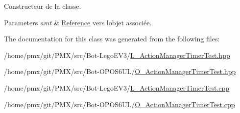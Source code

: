 Constructeur de la classe. 


\begin{DoxyParams}{Parameters}
{\em amt} & \hyperlink{structReference}{Reference} vers l\textquotesingle{}objet associée. \\
\hline
\end{DoxyParams}


The documentation for this class was generated from the following files\+:\begin{DoxyCompactItemize}
\item 
/home/pmx/git/\+P\+M\+X/src/\+Bot-\/\+Lego\+E\+V3/\hyperlink{L__ActionManagerTimerTest_8hpp}{L\+\_\+\+Action\+Manager\+Timer\+Test.\+hpp}\item 
/home/pmx/git/\+P\+M\+X/src/\+Bot-\/\+O\+P\+O\+S6\+U\+L/\hyperlink{O__ActionManagerTimerTest_8hpp}{O\+\_\+\+Action\+Manager\+Timer\+Test.\+hpp}\item 
/home/pmx/git/\+P\+M\+X/src/\+Bot-\/\+Lego\+E\+V3/\hyperlink{L__ActionManagerTimerTest_8cpp}{L\+\_\+\+Action\+Manager\+Timer\+Test.\+cpp}\item 
/home/pmx/git/\+P\+M\+X/src/\+Bot-\/\+O\+P\+O\+S6\+U\+L/\hyperlink{O__ActionManagerTimerTest_8cpp}{O\+\_\+\+Action\+Manager\+Timer\+Test.\+cpp}\end{DoxyCompactItemize}
